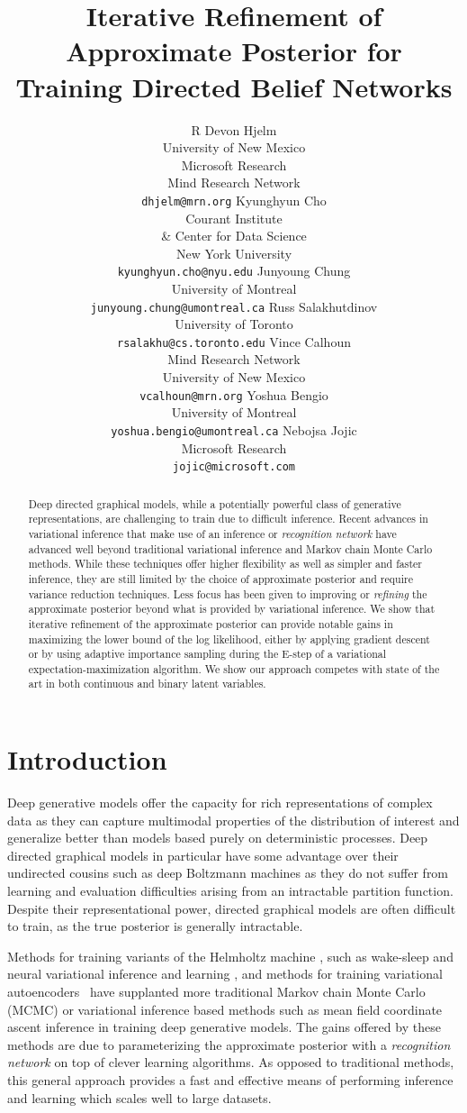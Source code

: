 \documentclass{article} %
\title{Iterative Refinement of \\ Approximate Posterior for \\ Training Directed Belief Networks}
\author{R Devon Hjelm \\
University of New Mexico \\  Microsoft Research \\ Mind Research Network \\
\texttt{\small dhjelm@mrn.org} 
\And
Kyunghyun Cho \\
Courant Institute \\ \& Center for Data Science \\
New York University \\
\texttt{\small kyunghyun.cho@nyu.edu}
\And
Junyoung Chung \\
University of Montreal \\
\texttt{\small junyoung.chung@umontreal.ca}
\And
Russ Salakhutdinov \\
University of Toronto \\
\texttt{\small rsalakhu@cs.toronto.edu}
\And
Vince Calhoun \\
Mind Research Network \\ University of New Mexico \\
\texttt{\small vcalhoun@mrn.org}
\And
Yoshua Bengio \\
University of Montreal \\
\texttt{\small yoshua.bengio@umontreal.ca}
\And
Nebojsa Jojic \\
Microsoft Research \\
\texttt{\small jojic@microsoft.com}
}
\begin{document}
\maketitle

\begin{abstract}
    Deep directed graphical models, while a potentially powerful
    class of generative representations, are challenging to train due to difficult inference. Recent advances in variational inference that make use
    of an inference or \emph{recognition network} have advanced well beyond
    traditional variational inference and Markov chain Monte Carlo methods. While these techniques
    offer higher flexibility as well as simpler and faster inference, they are
    still limited by the choice of approximate posterior and require variance
    reduction techniques. Less focus has been given to improving or \emph{refining} the
    approximate posterior beyond what is provided by variational inference. We
    show that iterative refinement of the approximate posterior can provide
    notable gains in maximizing the lower bound of the log likelihood, either
    by applying gradient descent or by using adaptive importance sampling
    during the E-step of a variational expectation-maximization algorithm. We show our approach
    competes with state of the art in both continuous and binary latent
    variables.
    \end{abstract}

\section{Introduction}

Deep generative models offer the capacity for rich representations of complex
data as they can capture multimodal properties of the distribution of
interest and generalize better than models based purely on deterministic processes. Deep directed
graphical models in particular have some advantage over their undirected
cousins such as deep Boltzmann machines \citep[DBMs,][]{salakhutdinov2009deep} as they do not suffer from
learning and evaluation difficulties arising from an intractable partition
function. Despite their representational power, directed graphical models are
often difficult to train, as the true posterior is generally intractable.

Methods for training variants of the Helmholtz machine
\citep{dayan1995helmholtz}, such as wake-sleep \citep{hinton1995wake,
bornschein2014reweighted} and neural variational inference and learning
\citep[NVIL,][]{mnih2014neural}, and methods for training variational
autoencoders~ \citep[VAE,][]{kingma2013auto} have supplanted more traditional
Markov chain Monte Carlo (MCMC) \citep{neal1992connectionist} or variational
inference based methods such as mean field coordinate ascent inference
\citep{saul1996mean} in training deep generative models. The gains offered by
these methods are due to parameterizing the approximate posterior with a
\emph{recognition network} on top of clever learning algorithms. As opposed to
traditional methods, this general approach provides a fast and effective means
of performing inference and learning which scales well to large datasets.
\end{document}
